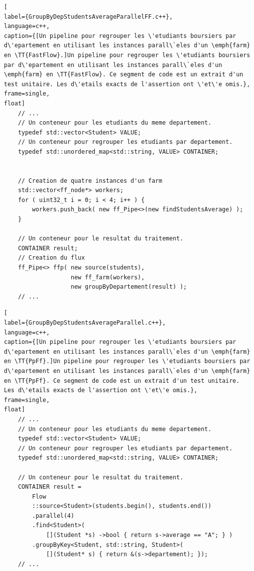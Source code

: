 \begin{lstlisting}[
label={GroupByDepStudentsAverageParallelFF.c++},
language=c++,
caption={[Un pipeline pour regrouper les \'etudiants boursiers par d\'epartement en utilisant les instances parall\`eles d'un \emph{farm} en \TT{FastFlow}.]Un pipeline pour regrouper les \'etudiants boursiers par d\'epartement en utilisant les instances parall\`eles d'un \emph{farm} en \TT{FastFlow}. Ce segment de code est un extrait d'un test unitaire. Les d\'etails exacts de l'assertion ont \'et\'e omis.},
frame=single,
float]
    // ...
    // Un conteneur pour les etudiants du meme departement.
    typedef std::vector<Student> VALUE;
    // Un conteneur pour regrouper les etudiants par departement.
    typedef std::unordered_map<std::string, VALUE> CONTAINER;

     
	// Creation de quatre instances d'un farm
	std::vector<ff_node*> workers;
	for ( uint32_t i = 0; i < 4; i++ ) {
		workers.push_back( new ff_Pipe<>(new findStudentsAverage) );
	}

	// Un conteneur pour le resultat du traitement.
	CONTAINER result;
	// Creation du flux
	ff_Pipe<> ffp( new source(students),
				   new ff_farm(workers),
				   new groupByDepartement(result) );     
    // ...
\end{lstlisting}

\begin{lstlisting}[
label={GroupByDepStudentsAverageParallel.c++},
language=c++,
caption={[Un pipeline pour regrouper les \'etudiants boursiers par d\'epartement en utilisant les instances parall\`eles d'un \emph{farm} en \TT{PpFf}.]Un pipeline pour regrouper les \'etudiants boursiers par d\'epartement en utilisant les instances parall\`eles d'un \emph{farm} en \TT{PpFf}. Ce segment de code est un extrait d'un test unitaire. Les d\'etails exacts de l'assertion ont \'et\'e omis.},
frame=single,
float]
    // ...
    // Un conteneur pour les etudiants du meme departement.
    typedef std::vector<Student> VALUE;
    // Un conteneur pour regrouper les etudiants par departement.
    typedef std::unordered_map<std::string, VALUE> CONTAINER;

	// Un conteneur pour le resultat du traitement.
    CONTAINER result = 
        Flow
        ::source<Student>(students.begin(), students.end())
        .parallel(4)
		.find<Student>( 
			[](Student *s) ->bool { return s->average == "A"; } )
        .groupByKey<Student, std::string, Student>(
        	[](Student* s) { return &(s->departement); });    
    // ...
\end{lstlisting}

